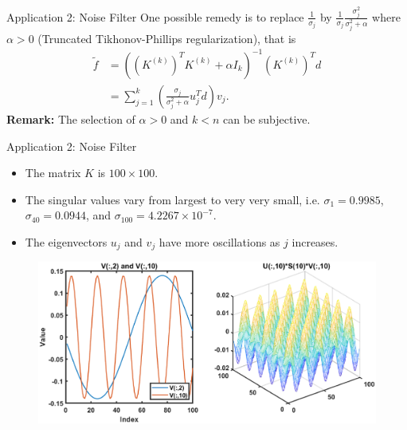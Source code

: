 \documentclass[aspectratio=169,xcolor=dvipsnames]{beamer}
\begin{document}
\begin{frame}{Application 2: Noise Filter}
    One possible remedy is to replace $\frac{1}{\sigma_j}$ by $\frac{1}{\sigma_j} \frac{\sigma^2_j}{\sigma^2_j + \alpha}$ where $\alpha>0$ (Truncated Tikhonov-Phillips regularization), that is
    \begin{align*}
        \tilde{f} &= \left( \left( K^{(k)}\right)^T K^{(k)} + \alpha I_k\right)^{-1} \left( K^{(k)}\right)^T d\\
        &= \sum^{k}_{j=1} \left( \frac{\sigma_j}{\sigma^2_j + \alpha} u^T_j d \right) v_j .
    \end{align*}
    \textbf{Remark:} The selection of $\alpha > 0$ and $k<n$ can be subjective. 
\end{frame}

\begin{frame}{Application 2: Noise Filter}
    \begin{itemize}
        \item The matrix $K$ is $100\times 100$.
        \item The singular values vary from largest to very very small, i.e. $\sigma_1 = 0.9985$, $\sigma_{40} = 0.0944$, and $\sigma_{100} = 4.2267\times 10^{-7}$.
        \item The eigenvectors $u_j$ and $v_j$ have more oscillations as $j$ increases.
    \end{itemize}
      \begin{figure}[h]
\includegraphics[width=11.5cm]{images/eigenvectors.eps}
\label{Fig3}
\end{figure}
\end{frame}
\end{document}

